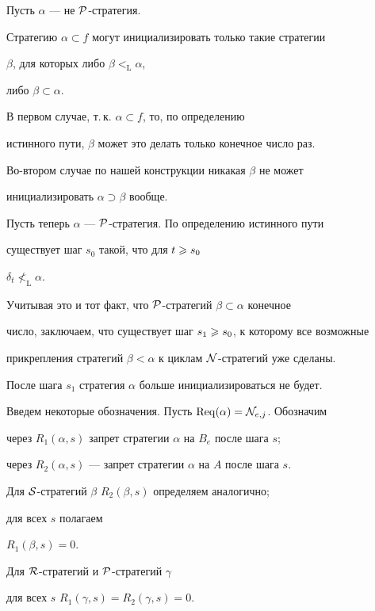 \begin{pf}


Пусть $\alpha$ --- не $\cal P$-стратегия.


Стратегию $\alpha\subset f$ могут инициализировать только такие стратегии


$\beta$, для которых либо $\beta<_{\mathrm L}\alpha$,


либо $\beta\subset\alpha$.


В первом случае, т.\,к. $\alpha\subset f$, то, по определению


истинного пути, $\beta$ может это делать только конечное число раз.


Во-втором случае по нашей конструкции никакая $\beta$ не может


инициализировать $\alpha\supset\beta$ вообще.


Пусть теперь $\alpha$ --- $\cal P$-стратегия. По определению истинного пути


существует шаг $s_0$ такой, что для $t\geqslant s_0$\;


$\delta_t\not<_{\mathrm L}\alpha$.


Учитывая это и тот факт, что $\cal P$-стратегий $\beta\subset\alpha$ конечное


число, заключаем, что существует шаг $s_1\geqslant s_0$, к которому все возможные


прикрепления стратегий $\beta<\alpha$ к циклам $\cal N$-стратегий уже сделаны.


После шага $s_1$ стратегия $\alpha$ больше инициализироваться не будет.


\end{pf}





Введем некоторые обозначения. Пусть $\operatorname{Req}(\alpha)={\cal N}_{e,j}$. Обозначим


через $R_1(\alpha,s)$ запрет стратегии $\alpha$ на $B_e$ после шага $s$;


через $R_2(\alpha,s)$ --- запрет стратегии $\alpha$ на $A$ после шага $s$.


Для $\cal S$-стратегий $\beta$\; $R_2(\beta,s)$ определяем аналогично;


для всех $s$ полагаем


$R_1(\beta,s)=0$.


Для $\cal R$-стратегий и $\cal P$-стратегий $\gamma$


для всех $s$\; $R_1(\gamma,s)=R_2(\gamma,s)=0$.





